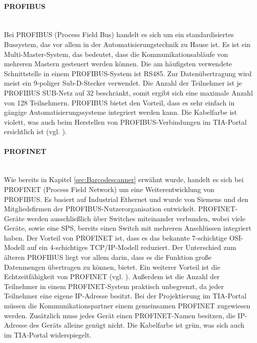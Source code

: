 \paragraph{PROFIBUS}\mbox{}\\
Bei PROFIBUS (Process Field Bus) handelt es sich um ein standardisiertes Bussystem, das vor allem in der Automatisierungstechnik zu Hause ist. Es ist ein Multi-Master-System, das bedeutet, dass die Kommunikationsabläufe von mehreren Mastern gesteuert werden können. Die am häufigsten verwendete Schnittstelle in einem PROFIBUS-System ist RS485. Zur Datenübertragung wird meist ein 9-poliger Sub-D-Stecker verwendet. Die Anzahl der Teilnehmer ist je PROFIBUS SUB-Netz auf 32 beschränkt, somit ergibt sich eine maximale Anzahl von 128 Teilnehmern. PROFIBUS bietet den Vorteil, dass es sehr einfach in gängige Automatisierungssysteme integriert werden kann. Die Kabelfarbe ist violett, was auch beim Herstellen von PROFIBUS-Verbindungen im TIA-Portal ersichtlich ist (vgl. \cite{Profibus}).

\paragraph{PROFINET}\mbox{}\\
Wie bereits in Kapitel \ref{sec:Barcodescanner} erwähnt wurde, handelt es sich bei PROFINET (Process Field Network) um eine Weiterentwicklung von PROFIBUS. Es basiert auf Industrial Ethernet und wurde von Siemens und den Mitgliedsfirmen der PROFIBUS-Nutzerorganisation entwickelt. PROFINET-Geräte werden ausschließlich über Switches miteinander verbunden, wobei viele Geräte, sowie eine SPS, bereits einen Switch mit mehreren Anschlüssen integriert haben. Der Vorteil von PROFINET ist, dass es das bekannte 7-schichtige OSI-Modell auf ein 4-schichtiges TCP/IP-Modell reduziert. Der Unterschied zum älteren PROFIBUS liegt vor allem darin, dass es die Funktion große Datenmengen übertragen zu können, bietet. Ein weiterer Vorteil ist die Echtzeitfähigkeit von PROFINET (vgl. \cite{Profinet}). Außerdem ist die Anzahl der Teilnehmer in einem PROFINET-System praktisch unbegrenzt, da jeder Teilnehmer eine eigene IP-Adresse besitzt. Bei der Projektierung im TIA-Portal müssen die Kommunikationspartner einem gemeinsamen PROFINET zugewiesen werden. Zusätzlich muss jedes Gerät einen PROFINET-Namen besitzen, die IP-Adresse des Geräts alleine genügt nicht. Die Kabelfarbe ist grün, was sich auch im TIA-Portal widerspiegelt.

